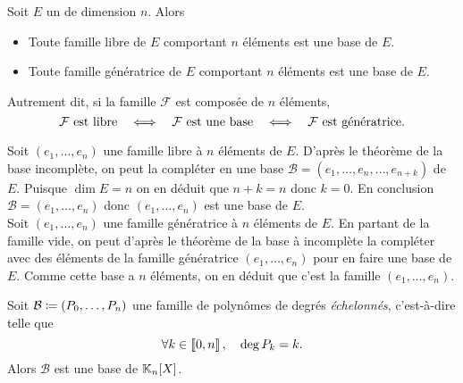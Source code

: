 \documentclass{magnolia}
\begin{document}
\begin{proposition}[utile=3]
Soit $E$ un \Kev de dimension $n$. Alors
\begin{itemize}
\item Toute famille libre de $E$ comportant $n$ éléments est une base de $E$.
\item Toute famille génératrice de $E$ comportant $n$ éléments est une base de
  $E$.
\end{itemize}
Autrement dit, si la famille $\mathcal{F}$ est composée de $n$ éléments,
\[\text{$\mathcal{F}$ est libre} \quad\Longleftrightarrow\quad \text{$\mathcal{F}$ est une base}
  \quad\Longleftrightarrow\quad \text{$\mathcal{F}$ est génératrice.}\]
\end{proposition}
\begin{preuve}
Soit $(e_1,\ldots,e_n)$ une famille libre à $n$ éléments de $E$. D'après le
théorème de la base incomplète, on peut la compléter en une base
$\mathcal{B}=(e_1,\ldots,e_n,\ldots,e_{n+k})$ de $E$. Puisque $\dim E=n$ on en
déduit que $n+k=n$ donc $k=0$. En conclusion $\mathcal{B}=(e_1,\ldots,e_n)$ donc
$(e_1,\ldots,e_n)$ est une base de $E$.\\
Soit $(e_1,\ldots,e_n)$ une famille génératrice à $n$ éléments de $E$. En partant
de la famille vide, on peut d'après le théorème de la base à incomplète la
compléter avec des éléments de la famille génératrice $(e_1,\ldots,e_n)$ pour
en faire une base de $E$. Comme cette base a $n$ éléments, on en déduit que
c'est la famille $(e_1,\ldots,e_n)$.
\end{preuve}

\begin{proposition}
Soit $\mathcal{B}\coloneqq (P_0,\ldots,P_n)$ une famille de polynômes de degrés
\emph{échelonnés}, c'est-à-dire telle que
\[\forall k\in\left\llbracket 0,n\right\rrbracket ,\quad \deg P_k=k.\]
Alors $\mathcal{B}$ est une base de $\polyK[n]$.
\end{proposition}

\end{document}
